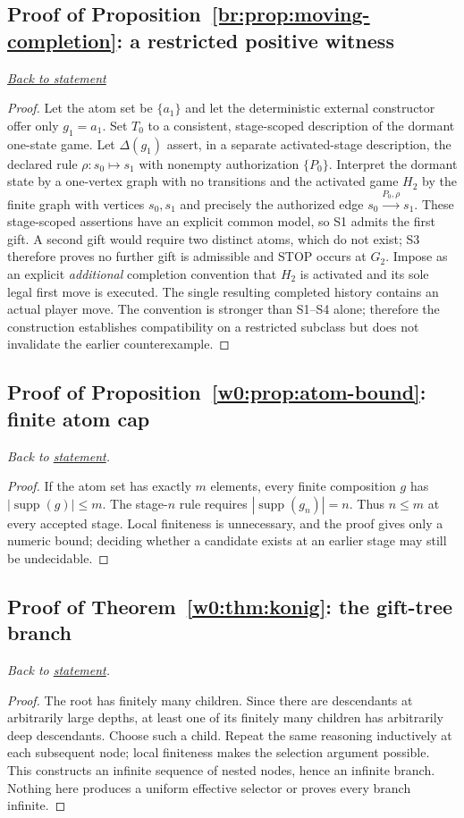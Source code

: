 \documentclass[11pt,letterpaper]{article}
\theoremstyle{definition}\newtheorem{definition}[theorem]{Definition}\newtheorem{example}[theorem]{Example}
\theoremstyle{remark}\newtheorem{remark}[theorem]{Remark}
\newcommand{\backlink}[1]{\noindent\hyperref[#1]{\textit{Back to statement}}\par\smallskip}
\begin{document}
\subsection{Proof of Proposition~\ref{br:prop:moving-completion}: a restricted positive witness}\label{br:pr:moving-completion}
\backlink{br:prop:moving-completion}
\begin{proof}
Let the atom set be $\{a_1\}$ and let the deterministic external
constructor offer only $g_1=a_1$. Set $T_0$ to a consistent, stage-scoped
description of the dormant one-state game. Let $\Delta(g_1)$ assert, in a
separate activated-stage description, the declared rule
$\rho:s_0\mapsto s_1$ with nonempty authorization $\{P_0\}$.
Interpret the dormant state by a one-vertex graph with no transitions and
the activated game $H_2$ by the finite graph with vertices $s_0,s_1$
and precisely the authorized edge $s_0\xrightarrow{P_0,\rho}s_1$.
These stage-scoped assertions have an explicit common model, so S1
admits the first gift. A second gift would require two distinct atoms,
which do not exist; S3 therefore proves no further gift is admissible
and STOP occurs at $G_2$. Impose as an explicit \emph{additional}
completion convention that $H_2$ is activated and its sole legal first
move is executed. The single resulting completed history contains an
actual player move. The convention is stronger than S1--S4 alone;
therefore the construction establishes compatibility on a restricted
subclass but does not invalidate the earlier counterexample.
\end{proof}


\subsection{Proof of Proposition~\ref{w0:prop:atom-bound}: finite atom cap}\label{w0:pr:atom-bound}
\textit{Back to \hyperref[w0:prop:atom-bound]{statement}.}
\begin{proof}
If the atom set has exactly $m$ elements, every finite composition $g$ has $|\operatorname{supp}(g)|\le m$. The stage-$n$ rule requires $|\operatorname{supp}(g_n)|=n$. Thus $n\le m$ at every accepted stage. Local finiteness is unnecessary, and the proof gives only a numeric bound; deciding whether a candidate exists at an earlier stage may still be undecidable.
\end{proof}


\subsection{Proof of Theorem~\ref{w0:thm:konig}: the gift-tree branch}\label{w0:pr:konig}
\textit{Back to \hyperref[w0:thm:konig]{statement}.}
\begin{proof}
The root has finitely many children. Since there are descendants at arbitrarily large depths, at least one of its finitely many children has arbitrarily deep descendants. Choose such a child. Repeat the same reasoning inductively at each subsequent node; local finiteness makes the selection argument possible. This constructs an infinite sequence of nested nodes, hence an infinite branch. Nothing here produces a uniform effective selector or proves every branch infinite.
\end{proof}
\end{document}
